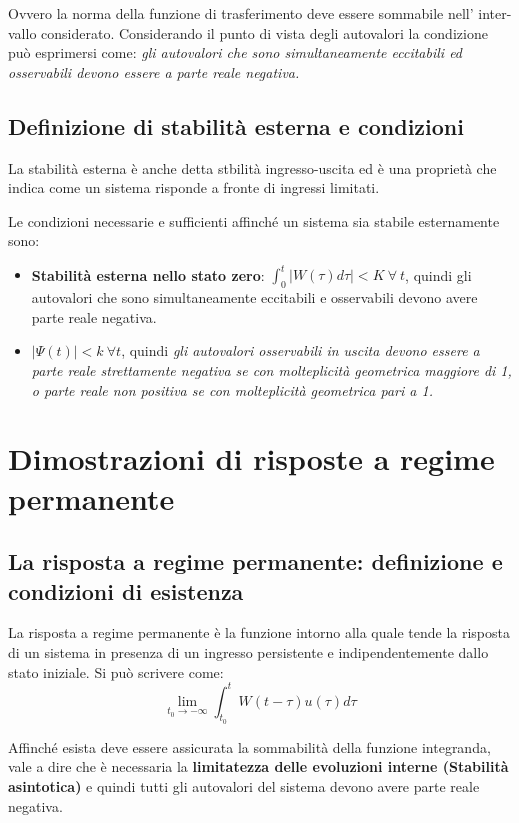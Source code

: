 \documentclass{article}
\begin{document}
Ovvero la norma della funzione di trasferimento deve essere sommabile nell' inter-
vallo considerato. Considerando il punto di vista degli autovalori la condizione può
esprimersi come: \textit{gli autovalori che sono simultaneamente eccitabili ed osservabili
devono essere a parte reale negativa.}


\subsection{Definizione di stabilità esterna e condizioni}
La stabilità esterna è anche detta stbilità ingresso-uscita
ed è una proprietà che indica come un sistema risponde
a fronte di ingressi limitati.

Le condizioni necessarie e sufficienti affinché un sistema sia stabile esternamente sono:
\begin{itemize}
\item  \textbf{Stabilità esterna nello stato zero}:
\(\displaystyle \int_{0}^{t} |W(\tau)d\tau|< K\ \forall\ t\),
quindi gli autovalori che sono simultaneamente eccitabili e osservabili
devono avere parte reale negativa.
\item $|\Psi(t)|<k\ \forall t$,
quindi \textit{gli autovalori osservabili in uscita devono essere a parte
reale strettamente negativa se con molteplicità geometrica maggiore di 1,
o parte reale non positiva se con molteplicità geometrica pari a 1.}
\end{itemize}



\section{Dimostrazioni di risposte a regime permanente}


\subsection{La risposta a regime permanente: definizione e condizioni di esistenza}
La risposta a regime permanente è la funzione intorno alla quale tende la risposta di un sistema
in presenza di un ingresso persistente e indipendentemente dallo stato iniziale.
Si può scrivere come:
\[\lim_ {t_0 \to -\infty} \int_{t_0}^{t} W(t-\tau)u(\tau) d\tau  \]

Affinché esista deve essere assicurata la sommabilità della funzione integranda,
vale a dire che è necessaria la \textbf{limitatezza delle evoluzioni interne (Stabilità asintotica)}
e quindi tutti gli autovalori del sistema devono avere parte reale negativa.
\end{document}
